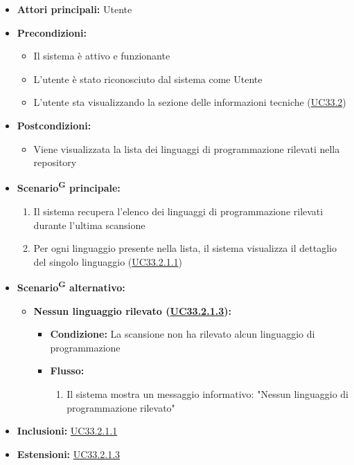 \documentclass[a4paper, 11pt]{article}
\begin{document}
\begin{itemize}
    \item \textbf{Attori principali:} Utente
    \item \textbf{Precondizioni:}
    \begin{itemize}
        \item Il sistema è attivo e funzionante
        \item L'utente è stato riconosciuto dal sistema come Utente
        \item L'utente sta visualizzando la sezione delle informazioni tecniche (\hyperref[UC33.2]{UC33.2})
    \end{itemize}
    \item \textbf{Postcondizioni:}
    \begin{itemize}
        \item Viene visualizzata la lista dei linguaggi di programmazione rilevati nella repository
    \end{itemize}
    \item \textbf{Scenario\textsuperscript{G} principale:}
    \begin{enumerate}
        \item Il sistema recupera l'elenco dei linguaggi di programmazione rilevati durante l'ultima scansione
        \item Per ogni linguaggio presente nella lista, il sistema visualizza il dettaglio del singolo linguaggio (\hyperref[UC33.2.1.1]{UC33.2.1.1})
    \end{enumerate}
    \item \textbf{Scenario\textsuperscript{G} alternativo:}
    \begin{itemize}
        \item \textbf{Nessun linguaggio rilevato (\hyperref[UC33.2.1.3]{UC33.2.1.3}):}
        \begin{itemize}
            \item \textbf{Condizione:} La scansione non ha rilevato alcun linguaggio di programmazione
            \item \textbf{Flusso:}
            \begin{enumerate}
                \item Il sistema mostra un messaggio informativo: "Nessun linguaggio di programmazione rilevato"
            \end{enumerate}
        \end{itemize}
    \end{itemize}
    \item \textbf{Inclusioni:} \hyperref[UC33.2.1.1]{UC33.2.1.1}
    \item \textbf{Estensioni:} \hyperref[UC33.2.1.3]{UC33.2.1.3}
\end{itemize}
\end{document}

